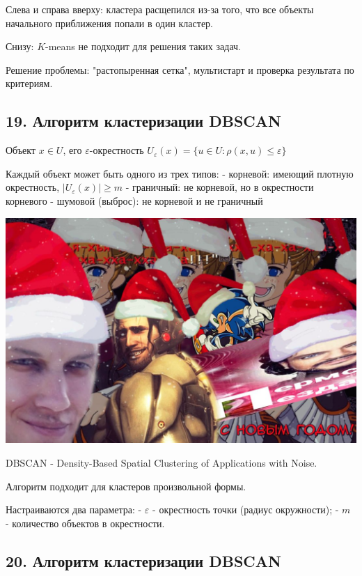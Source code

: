 Слева и справа вверху: кластера расщепился из-за того, что все объекты
начального приближения попали в один кластер.

Снизу: $K$-means не подходит для решения таких задач.

Решение проблемы: "растопыренная сетка", мультистарт и проверка результата
по критериям.

\subsection{19. Алгоритм кластеризации DBSCAN}

Объект $x \in U$, его $\varepsilon$-окрестность $U_{\varepsilon}{(x)} = {\lbrace u \in U \! : \rho{(x, u)} \leqslant \varepsilon \rbrace}$

Каждый объект может быть одного из трех типов:
- корневой: имеющий плотную окрестность, ${\vert U_{\varepsilon}{(x)}\vert} \geqslant m$
- граничный: не корневой, но в окрестности корневого
- шумовой (выброс): не корневой и не граничный

\includegraphics[scale=0.3]{figures/samplefigure.jpg}

DBSCAN - Density-Based Spatial Clustering of Applications with Noise.

Алгоритм подходит для кластеров произвольной формы.

Настраиваются два параметра:
- $\varepsilon$ - окрестность точки (радиус окружности);
- $m$ - количество объектов в окрестности.

\subsection{20. Алгоритм кластеризации DBSCAN}

